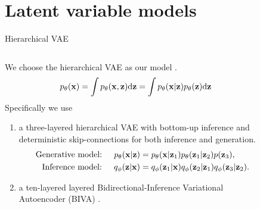 


\section{Latent variable models}

\begin{frame}{Hierarchical VAE}
  \begin{columns}
      \begin{column}{0.7\textwidth}
          We choose the hierarchical VAE as our model \cite{kingma_autoencoding_2014, rezende_stochastic_2014}.
          \begin{equation*}
              p_\theta({\mathbf{x}}) = \int p_\theta({\mathbf{x}},{\mathbf{z}}) \text{d}{\mathbf{z}} = \int p_\theta({\mathbf{x}}|{\mathbf{z}})p_\theta({\mathbf{z}}) \text{d}{\mathbf{z}}
          \end{equation*}
          Specifically we use
          
          \begin{enumerate}
              \item a three-layered hierarchical VAE with bottom-up inference and deterministic skip-connections for both inference and generation.
              \begin{align*}
                  \text{Generative model: }\quad p_\theta({\mathbf{x}}|{\mathbf{z}}) &= p_\theta({\mathbf{x}}|{\mathbf{z}}_1) p_\theta({\mathbf{z}}_1|{\mathbf{z}}_2) p({\mathbf{z}}_3),\\
                  \text{Inference model: }\quad q_\phi({\mathbf{z}}|{\mathbf{x}}) &= q_\phi({\mathbf{z}}_1|{\mathbf{x}})q_\phi({\mathbf{z}}_2|{\mathbf{z}}_1)q_\phi({\mathbf{z}}_3|{\mathbf{z}}_2).
              \end{align*}
              \item a ten-layered layered Bidirectional-Inference Variational Autoencoder (BIVA) \cite{maaloe_biva_2019}.
          \end{enumerate} 
      \end{column}
      \begin{column}{0.3\textwidth}
          \begin{figure}[.5\textwidth]
\end{figure}
\end{column}
\end{columns}
\end{frame}
